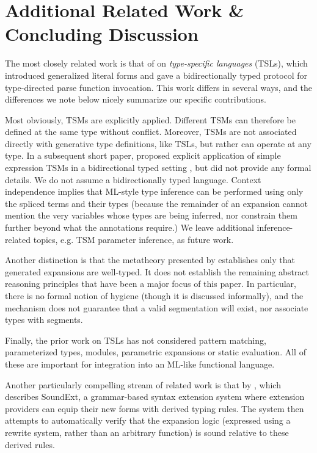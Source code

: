 \documentclass[acmlarge,review,anonymous]{acmart}\settopmatter{printfolios=true}
\begin{document}
\newcommand{\discussionSec}{Additional Related Work \& Concluding Discussion}
\section{\protect\discussionSec}
\label{sec:related-work}
\label{sec:discussion}
\label{sec:conclusion}
\vspace{-3px}
The most closely related work is that of \citet{TSLs} on \emph{type-specific languages} (TSLs), which introduced generalized literal forms and gave a bidirectionally typed protocol for type-directed parse function invocation. This work differs in several ways, and the differences we note below nicely summarize our specific contributions. 

Most obviously, TSMs are explicitly applied. Different TSMs can therefore be defined at the same type without conflict. Moreover, TSMs are not associated directly with generative type definitions, like TSLs,  but rather can operate at any type. In a subsequent short paper, \citet{sac15} proposed explicit application of simple expression TSMs in a bidirectional typed setting \cite{Pierce:2000:LTI:345099.345100}, but did not provide any formal details. We do not assume a bidirectionally typed language. Context independence implies that ML-style type inference can be performed using only the spliced terms and their types (because the remainder of an expansion cannot mention the very variables whose types are being inferred, nor constrain them further beyond what the annotations require.) We leave additional inference-related topics, e.g. TSM parameter inference, as future work.

Another distinction is that the metatheory presented by \citet{TSLs} establishes only that generated expansions are well-typed. It does not establish the remaining abstract reasoning principles that have been a major focus of this paper. In particular, there is no formal notion of hygiene (though it is discussed informally), and the mechanism does not guarantee that a valid segmentation will exist, nor associate types with segments.

Finally, the prior work on TSLs has not considered pattern matching, parameterized types, modules, parametric expansions or static evaluation. All of these are important for integration into an ML-like functional language.

Another particularly compelling stream of related work is that by \citet{conf/icfp/LorenzenE13,conf/popl/LorenzenE16}, which describes SoundExt, a grammar-based syntax extension system where extension providers can equip their new forms with derived typing rules. The system then attempts to automatically verify that the expansion logic (expressed using a rewrite system, rather than an arbitrary function) is sound relative to these derived rules. 
\end{document}
